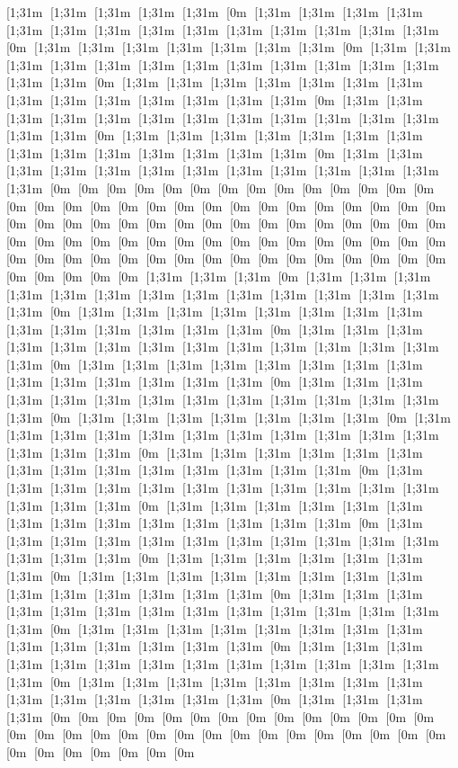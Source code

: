 [1;31m [1;31m [1;31m [1;31m [1;31m [0m [1;31m [1;31m [1;31m [1;31m [1;31m [1;31m [1;31m [1;31m [1;31m [1;31m [1;31m [1;31m [1;31m [1;31m [0m [1;31m [1;31m [1;31m [1;31m [1;31m [1;31m [1;31m [0m [1;31m [1;31m [1;31m [1;31m [1;31m [1;31m [1;31m [1;31m [1;31m [1;31m [1;31m [1;31m [1;31m [1;31m [0m [1;31m [1;31m [1;31m [1;31m [1;31m [1;31m [1;31m [1;31m [1;31m [1;31m [1;31m [1;31m [1;31m [1;31m [0m [1;31m [1;31m [1;31m [1;31m [1;31m [1;31m [1;31m [1;31m [1;31m [1;31m [1;31m [1;31m [1;31m [1;31m [0m [1;31m [1;31m [1;31m [1;31m [1;31m [1;31m [1;31m [1;31m [1;31m [1;31m [1;31m [1;31m [1;31m [1;31m [0m [1;31m [1;31m [1;31m [1;31m [1;31m [1;31m [1;31m [1;31m [1;31m [1;31m [1;31m [1;31m [1;31m [0m [0m [0m [0m [0m [0m [0m [0m [0m [0m [0m [0m [0m [0m [0m [0m [0m [0m [0m [0m [0m [0m [0m [0m [0m [0m [0m [0m [0m [0m [0m [0m [0m [0m [0m [0m [0m [0m [0m [0m [0m [0m [0m [0m [0m [0m [0m [0m [0m [0m [0m [0m [0m [0m [0m [0m [0m [0m [0m [0m [0m [0m [0m [0m [0m [0m [0m [0m [0m [0m [0m [0m [0m [0m [0m [0m [0m [0m [0m [0m [0m [0m [0m [1;31m [1;31m [1;31m [0m [1;31m [1;31m [1;31m [1;31m [1;31m [1;31m [1;31m [1;31m [1;31m [1;31m [1;31m [1;31m [1;31m [1;31m [0m [1;31m [1;31m [1;31m [1;31m [1;31m [1;31m [1;31m [1;31m [1;31m [1;31m [1;31m [1;31m [1;31m [1;31m [0m [1;31m [1;31m [1;31m [1;31m [1;31m [1;31m [1;31m [1;31m [1;31m [1;31m [1;31m [1;31m [1;31m [1;31m [0m [1;31m [1;31m [1;31m [1;31m [1;31m [1;31m [1;31m [1;31m [1;31m [1;31m [1;31m [1;31m [1;31m [1;31m [0m [1;31m [1;31m [1;31m [1;31m [1;31m [1;31m [1;31m [1;31m [1;31m [1;31m [1;31m [1;31m [1;31m [1;31m [0m [1;31m [1;31m [1;31m [1;31m [1;31m [1;31m [1;31m [0m [1;31m [1;31m [1;31m [1;31m [1;31m [1;31m [1;31m [1;31m [1;31m [1;31m [1;31m [1;31m [1;31m [1;31m [0m [1;31m [1;31m [1;31m [1;31m [1;31m [1;31m [1;31m [1;31m [1;31m [1;31m [1;31m [1;31m [1;31m [1;31m [0m [1;31m [1;31m [1;31m [1;31m [1;31m [1;31m [1;31m [1;31m [1;31m [1;31m [1;31m [1;31m [1;31m [1;31m [0m [1;31m [1;31m [1;31m [1;31m [1;31m [1;31m [1;31m [1;31m [1;31m [1;31m [1;31m [1;31m [1;31m [1;31m [0m [1;31m [1;31m [1;31m [1;31m [1;31m [1;31m [1;31m [1;31m [1;31m [1;31m [1;31m [1;31m [1;31m [1;31m [0m [1;31m [1;31m [1;31m [1;31m [1;31m [1;31m [1;31m [0m [1;31m [1;31m [1;31m [1;31m [1;31m [1;31m [1;31m [1;31m [1;31m [1;31m [1;31m [1;31m [1;31m [1;31m [0m [1;31m [1;31m [1;31m [1;31m [1;31m [1;31m [1;31m [1;31m [1;31m [1;31m [1;31m [1;31m [1;31m [1;31m [0m [1;31m [1;31m [1;31m [1;31m [1;31m [1;31m [1;31m [1;31m [1;31m [1;31m [1;31m [1;31m [1;31m [1;31m [0m [1;31m [1;31m [1;31m [1;31m [1;31m [1;31m [1;31m [1;31m [1;31m [1;31m [1;31m [1;31m [1;31m [1;31m [0m [1;31m [1;31m [1;31m [1;31m [1;31m [1;31m [1;31m [1;31m [1;31m [1;31m [1;31m [1;31m [1;31m [1;31m [0m [1;31m [1;31m [1;31m [1;31m [0m [0m [0m [0m [0m [0m [0m [0m [0m [0m [0m [0m [0m [0m [0m [0m [0m [0m [0m [0m [0m [0m [0m [0m [0m [0m [0m [0m [0m [0m [0m [0m [0m [0m [0m [0m [0m 